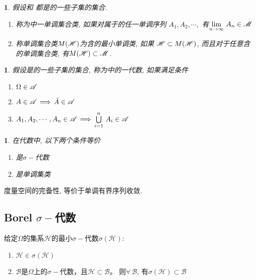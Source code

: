 \newtheorem{monotonic_set_class}[theorem_root]{}
\begin{monotonic_set_class}
假设\msM 和 \msH 都是\mO 的一些子集的集合.
\begin{enumerate}
    \item 称\msM 为\mO 中一单调集合类, 如果对属于\msM 的任一单调序列
    $A_1, A_2,\cdots,$ 有\(\lim\limits_{n\to\infty}\,A_n\in\msM\)
    \item 称单调集合类$M(\msH)$为含\msH 的最小单调类, 如果
    \(\msH\subset M(\msH)\), 而且对于任意含\msH 的单调集合类\msM, 有$M(\msH)\subset \msM$.
\end{enumerate}
\end{monotonic_set_class}

\newtheorem{__algebra}[theorem_root]{}
\begin{__algebra}
假设\msA 是\mO 的一些子集的集合, 称\msA 为\mO 中的一代数, 如果满足条件
\begin{enumerate}
\item $\mO\in\msA$
\item $A\in\msA\,\Longrightarrow\,\bar{A}\in\msA$
\item \(A_1, A_2, \cdots, A_n\in\msA\,\Longrightarrow\,\bigcup\limits_{i=1}^n\,A_i\in\msA\)
\end{enumerate}
\end{__algebra}

\newtheorem{relation_monotonic_sigma_algebra}[theorem_root]{\theorem}
\begin{relation_monotonic_sigma_algebra}
在代数\msH 中, 以下两个条件等价
\begin{enumerate}
    \item \msH 是\(\sigma-\)代数
    \item \msH 是单调集类
\end{enumerate}
\end{relation_monotonic_sigma_algebra}

度量空间的完备性, 等价于单调有界序列收敛.

\subsection{Borel $\sigma-$代数}

\begin{smallestsigmaalgebraset}
给定$\Omega$的集系$\mathscr{H}$的最小$\sigma-$代数$\sigma(\mathscr{H})$:
\begin{enumerate}
    \item$\mathscr{H}\in\sigma(\mathscr{H})$
    \item$\mathscr{B}$是$\Omega$上的$\sigma-$代数，且$\mathscr{H}\subset\mathscr{B}$。%
        则$\forall\,\mathscr{B}$, 有$\sigma(\mathscr{H})\subset\mathscr{B}$
\end{enumerate}
\end{smallestsigmaalgebraset}


